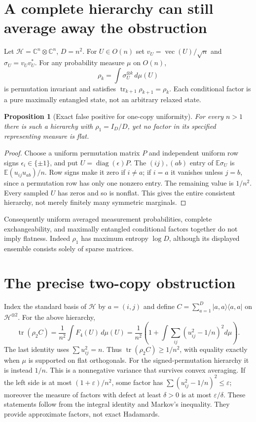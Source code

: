 \documentclass[11pt]{article}
\newtheorem{proposition}[theorem]{Proposition}
\newcommand{\tr}{\operatorname{tr}}
\begin{document}
\section{A complete hierarchy can still average away the obstruction}
Let $\mathcal H=\mathbb C^n\otimes\mathbb C^n$, $D=n^2$.
For $U\in O(n)$ set $v_U=\operatorname{vec}(U)/\sqrt n$ and
$\sigma_U=v_Uv_U^*$. For any probability measure $\mu$ on $O(n)$,
\[
 \rho_k=\int\sigma_U^{\otimes k}\,d\mu(U)
\]
is permutation invariant and satisfies $\tr_{k+1}\rho_{k+1}=\rho_k$.
Each conditional factor is a pure maximally entangled state, not an
arbitrary relaxed state.
\begin{proposition}[Exact false positive for one-copy uniformity]
For every $n>1$ there is such a hierarchy with $\rho_1=I_D/D$,
yet no factor in its specified representing measure is flat.
\end{proposition}
\begin{proof}
Choose a uniform permutation matrix $P$ and independent uniform row
signs $\epsilon_i\in\{\pm1\}$, and put $U=\operatorname{diag}(\epsilon)P$.
The $(ij),(ab)$ entry of $\mathbb E\sigma_U$ is
$\mathbb E(u_{ij}u_{ab})/n$. Row signs make it zero if $i\ne a$;
if $i=a$ it vanishes unless $j=b$, since a permutation row has only
one nonzero entry. The remaining value is $1/n^2$. Every sampled
$U$ has zeros and so is nonflat. This gives the entire consistent
hierarchy, not merely finitely many symmetric marginals.
\end{proof}
Consequently uniform averaged measurement probabilities, complete
exchangeability, and maximally entangled conditional factors together
do not imply flatness. Indeed $\rho_1$ has maximum entropy $\log D$,
although its displayed ensemble consists solely of sparse matrices.

\section{The precise two-copy obstruction}
Index the standard basis of $\mathcal H$ by $a=(i,j)$ and define
$C=\sum_{a=1}^D |a,a\rangle\langle a,a|$ on $\mathcal H^{\otimes2}$.
For the above hierarchy,
\begin{equation}\label{coincidence}
 \tr(\rho_2 C)=\frac1{n^2}\int F_4(U)\,d\mu(U)
 =\frac1{n^2}\left(1+\int\sum_{ij}(u_{ij}^2-1/n)^2d\mu\right).
\end{equation}
The last identity uses $\sum u_{ij}^2=n$. Thus $\tr(\rho_2C)\ge1/n^2$,
with equality exactly when $\mu$ is supported on flat orthogonals.
For the signed-permutation hierarchy it is instead $1/n$.
This is a nonnegative variance that survives convex averaging.
If the left side is at most $(1+\varepsilon)/n^2$, some factor has
$\sum(u_{ij}^2-1/n)^2\le\varepsilon$; moreover the measure of factors
with defect at least $\delta>0$ is at most $\varepsilon/\delta$.
These statements follow from the integral identity and Markov's
inequality. They provide approximate factors, not exact Hadamards.
\end{document}

